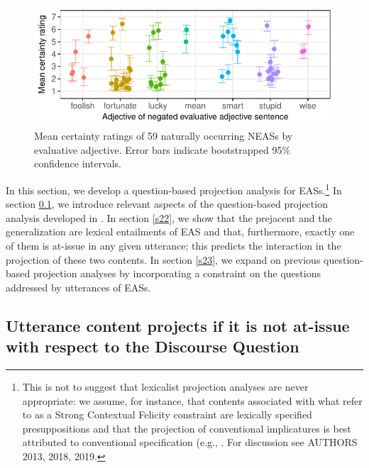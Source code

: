 \documentclass[11pt,fleqn]{article}
\newcommand{\6}{\mbox{$[\hspace*{-.6mm}[$}}
\newcommand{\9}{\mbox{$]\hspace*{-.6mm}]$}}
\begin{document}
\begin{figure}[h!]
\centering

\includegraphics[width=.6\paperwidth]{../exp1-corpus-study/graphs/mean-response-by-item-and-adj}

\caption{Mean certainty ratings of 59 naturally occurring NEASs by evaluative adjective. Error bars indicate bootstrapped 95\% confidence intervals.}\label{f-corpus}

\end{figure}

In this section, we develop a question-based projection analysis for EASs.\footnote{This is not to suggest that lexicalist projection analyses are never appropriate: we assume, for instance, that contents associated with what \citealt{brst-lang11} refer to as a Strong Contextual Felicity constraint are lexically specified presuppositions and that the projection of conventional implicatures is best attributed to conventional specification (e.g., \citealt{potts05,murray2014}. For discussion  see AUTHORS 2013, 2018, 2019.
} In section \ref{s21}, we introduce relevant aspects of the question-based projection analysis developed in \citealt{best-question}. In section \ref{s22}, we show that the prejacent and the generalization are lexical entailments of EAS and that, furthermore, exactly one of them is at-issue in any given utterance; this predicts the interaction in the projection of these two contents. In section \ref{s23}, we expand on previous question-based projection analyses by incorporating a constraint on the questions addressed by utterances of EASs.

\subsection{Utterance content projects if it is not at-issue with respect to the Discourse Question}\label{s21}
\end{document}
